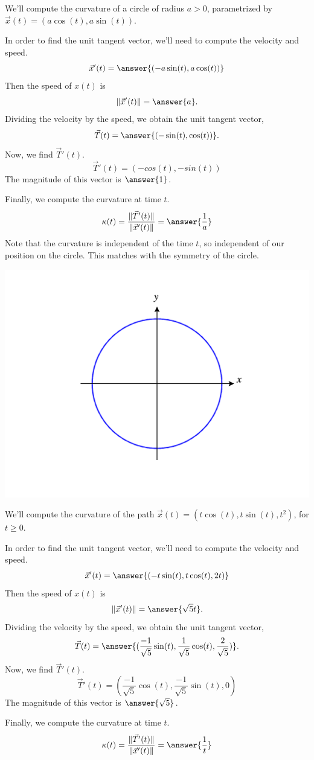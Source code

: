 \documentclass{ximera}
\begin{document}
\begin{example}
We'll compute the curvature of a circle of radius $a>0$, parametrized by $\vec{x}(t) = (a\cos(t), a\sin(t))$.

In order to find the unit tangent vector, we'll need to compute the velocity and speed.
\[
\vec{x}'(t) = \answer{(-a\sin(t), a\cos(t))}
\]
Then the speed of $x(t)$ is
\[
\|\vec{x}'(t)\| = \answer{a}.
\]
Dividing the velocity by the speed, we obtain the unit tangent vector,
\[
\vec{T}(t) = \answer{(-\sin(t),\cos(t))}.
\]
Now, we find $\vec{T}'(t)$.
\[
\vec{T}'(t) = (-cos(t),-sin(t))
\]
The magnitude of this vector is $\answer{1}$.

Finally, we compute the curvature at time $t$.
\[
\kappa(t) = \frac{\|\vec{T}'(t)\|}{\|\vec{x}'(t)\|} = \answer{\frac{1}{a}}
\]
Note that the curvature is independent of the time $t$, so independent of our position on the circle. This matches with the symmetry of the circle.

\begin{image}
\includegraphics[width=\textwidth]{CalcPlot3D-generic_circle}
\end{image}
\end{example}

\begin{example}
We'll compute the curvature of the path $\vec{x}(t) = (t\cos(t),t\sin(t), t^2)$, for $t\geq 0$.

In order to find the unit tangent vector, we'll need to compute the velocity and speed.
\[
\vec{x}'(t) = \answer{(-t\sin(t), t\cos(t),2t)}
\]
Then the speed of $x(t)$ is
\[
\|\vec{x}'(t)\| = \answer{\sqrt{5}t}.
\]
Dividing the velocity by the speed, we obtain the unit tangent vector,
\[
\vec{T}(t) = \answer{(\frac{-1}{\sqrt{5}}\sin(t),\frac{1}{\sqrt{5}}\cos(t), \frac{2}{\sqrt{5}})}.
\]
Now, we find $\vec{T}'(t)$.
\[
\vec{T}'(t) = (\frac{-1}{\sqrt{5}}\cos(t),\frac{-1}{\sqrt{5}}\sin(t), 0)
\]
The magnitude of this vector is $\answer{\sqrt{5}}$.

Finally, we compute the curvature at time $t$.
\[
\kappa(t) = \frac{\|\vec{T}'(t)\|}{\|\vec{x}'(t)\|} = \answer{\frac{1}{t}}
\]
\end{example}
\end{document}
